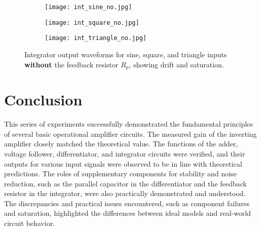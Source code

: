 \documentclass[12pt,a4paper]{article}
\begin{document}
\begin{figure}[H]
    \centering
    \begin{subfigure}[b]{0.32\linewidth}
        \texttt{[image: int\_sine\_no.jpg]} 
    \end{subfigure}
    \begin{subfigure}[b]{0.32\linewidth}
        \texttt{[image: int\_square\_no.jpg]} 
    \end{subfigure}
    \begin{subfigure}[b]{0.32\linewidth}
        \texttt{[image: int\_triangle\_no.jpg]} 
    \end{subfigure}
    \caption{Integrator output waveforms for sine, square, and triangle inputs \textbf{without} the feedback resistor \(R_p\), showing drift and saturation.}
    \label{fig:integrator_no}
\end{figure}




\section{Conclusion}
This series of experiments successfully demonstrated the fundamental principles of several basic operational amplifier circuits. The measured gain of the inverting amplifier closely matched the theoretical value. The functions of the adder, voltage follower, differentiator, and integrator circuits were verified, and their outputs for various input signals were observed to be in line with theoretical predictions. The roles of supplementary components for stability and noise reduction, such as the parallel capacitor in the differentiator and the feedback resistor in the integrator, were also practically demonstrated and understood. The discrepancies and practical issues encountered, such as component failures and saturation, highlighted the differences between ideal models and real-world circuit behavior.
\end{document}
